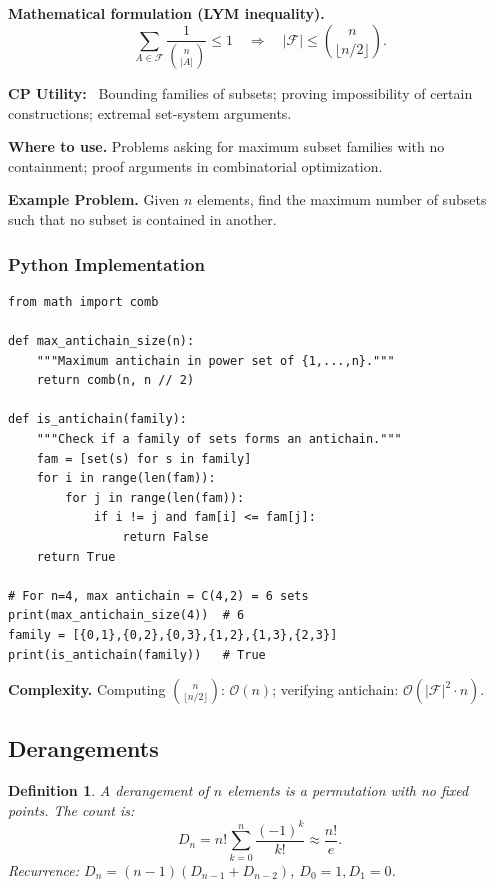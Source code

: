 \documentclass[10pt,a4paper]{article}
\theoremstyle{cpstyle}
\newtheorem{definition}[theorem]{Definition}
\newenvironment{cputility}{%
  \begin{mdframed}[backgroundcolor=theorembg, linecolor=accent!50, linewidth=1pt,
    innerleftmargin=10pt, innerrightmargin=10pt, innertopmargin=6pt, innerbottommargin=6pt]
  \textbf{\color{accent}CP Utility:}~}{%
  \end{mdframed}}
\newcommand{\bigO}[1]{\mathcal{O}\!\left(#1\right)}
\begin{document}
\textbf{Mathematical formulation (LYM inequality).}
\[
  \sum_{A \in \mathcal{F}} \frac{1}{\binom{n}{|A|}} \leq 1 \quad \Longrightarrow \quad |\mathcal{F}| \leq \binom{n}{\lfloor n/2 \rfloor}.
\]

\begin{cputility}
Bounding families of subsets; proving impossibility of certain constructions; extremal set-system arguments.
\end{cputility}

\textbf{Where to use.} Problems asking for maximum subset families with no containment; proof arguments in combinatorial optimization.

\textbf{Example Problem.} Given $n$ elements, find the maximum number of subsets such that no subset is contained in another.

\subsubsection{Python Implementation}
\begin{lstlisting}[caption={Sperner's Theorem -- max antichain and verification}]
from math import comb

def max_antichain_size(n):
    """Maximum antichain in power set of {1,...,n}."""
    return comb(n, n // 2)

def is_antichain(family):
    """Check if a family of sets forms an antichain."""
    fam = [set(s) for s in family]
    for i in range(len(fam)):
        for j in range(len(fam)):
            if i != j and fam[i] <= fam[j]:
                return False
    return True

# For n=4, max antichain = C(4,2) = 6 sets
print(max_antichain_size(4))  # 6
family = [{0,1},{0,2},{0,3},{1,2},{1,3},{2,3}]
print(is_antichain(family))   # True
\end{lstlisting}

\textbf{Complexity.} Computing $\binom{n}{\lfloor n/2\rfloor}$: $\bigO{n}$; verifying antichain: $\bigO{|\mathcal{F}|^2 \cdot n}$.

\subsection{Derangements}

\begin{definition}
A derangement of $n$ elements is a permutation with no fixed points. The count is:
\[
  D_n = n!\sum_{k=0}^{n}\frac{(-1)^k}{k!} \approx \frac{n!}{e}.
\]
Recurrence: $D_n = (n-1)(D_{n-1} + D_{n-2})$, $D_0=1, D_1=0$.
\end{definition}
\end{document}
